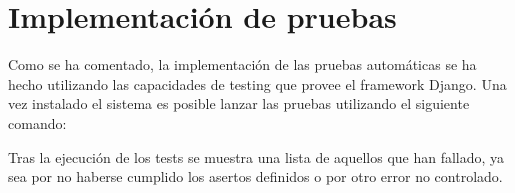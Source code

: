 \section{Implementación de pruebas}

Como se ha comentado, la implementación de las pruebas automáticas se ha hecho
utilizando las capacidades de testing que provee el framework Django. Una vez
instalado el sistema es posible lanzar las pruebas utilizando el siguiente comando:


Tras la ejecución de los tests se muestra una lista de aquellos que han fallado,
ya sea por no haberse cumplido los asertos definidos o por otro error no
controlado. 


